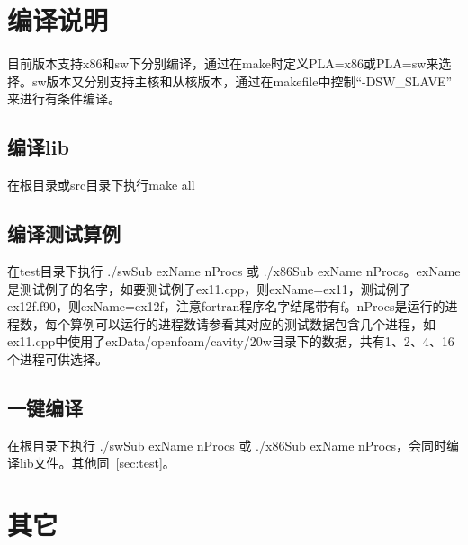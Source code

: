 \documentclass{ctexart}
\begin{document}
\section{编译说明}
目前版本支持x86和sw下分别编译，通过在make时定义PLA=x86或PLA=sw来选择。sw版本又分别支持主核和从核版本，通过在makefile中控制“-DSW\_SLAVE”
来进行有条件编译。

\subsection{编译lib}
在根目录或src目录下执行make all

\subsection{编译测试算例}{\label{sec:test}}
在test目录下执行 ./swSub exName nProcs 或 ./x86Sub exName nProcs。exName是测试例子的名字，如要测试例子ex11.cpp，则exName=ex11，测试例子ex12f.f90，则exName=ex12f，注意fortran程序名字结尾带有f。nProcs是运行的进程数，每个算例可以运行的进程数请参看其对应的测试数据包含几个进程，如ex11.cpp中使用了exData/openfoam/cavity/20w目录下的数据，共有1、2、4、16个进程可供选择。

\subsection{一键编译}
在根目录下执行 ./swSub exName nProcs 或 ./x86Sub exName nProcs，会同时编译lib文件。其他同~\ref{sec:test}。


\section{其它}
\end{document}
